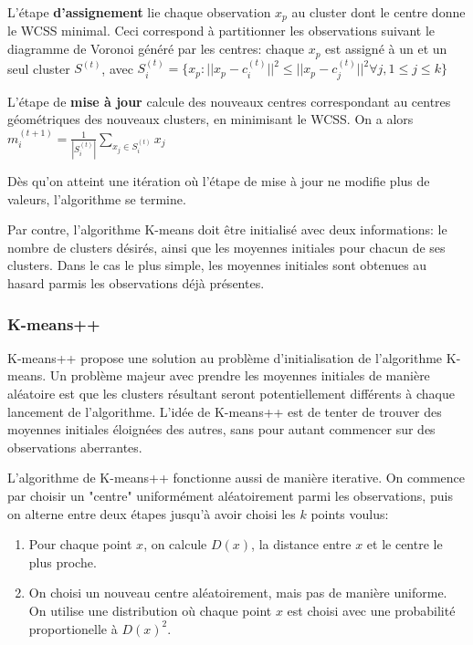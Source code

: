 \documentclass{article}
\begin{document}
      L'étape \textbf{d'assignement} lie chaque observation $x_p$ au cluster dont le centre donne le WCSS minimal. Ceci correspond à partitionner les observations suivant le diagramme de Voronoi généré par les centres: chaque $x_p$ est assigné à un et un seul cluster $S^{(t)}$, avec $S_i^{(t)}=\{x_p:||x_p-c_i^{(t)}||^2\leq ||x_p-c_j^{(t)}||^2\forall j,1\leq j\leq k\}$

      L'étape de \textbf{mise à jour} calcule des nouveaux centres correspondant au centres géométriques des nouveaux clusters, en minimisant le WCSS. On a alors $m_i^{(t+1)}=\frac{1}{|S_i^{(t)}|}\sum_{x_j\in S_i^{(t)}}x_j$

      Dès qu'on atteint une itération où l'étape de mise à jour ne modifie plus de valeurs, l'algorithme se termine.

      Par contre, l'algorithme K-means doit être initialisé avec deux informations: le nombre de clusters désirés, ainsi que les moyennes initiales pour chacun de ses clusters. Dans le cas le plus simple, les moyennes initiales sont obtenues au hasard parmis les observations déjà présentes.

      \newpage
      \subsubsection{K-means++}

        K-means++ propose une solution au problème d'initialisation de l'algorithme K-means. Un problème majeur avec prendre les moyennes initiales de manière aléatoire est que les clusters résultant seront potentiellement différents à chaque lancement de l'algorithme. L'idée de K-means++ est de tenter de trouver des moyennes initiales éloignées des autres, sans pour autant commencer sur des observations aberrantes.

        L'algorithme de K-means++ fonctionne aussi de manière iterative. On commence par choisir un "centre" uniformément aléatoirement parmi les observations, puis on alterne entre deux étapes jusqu'à avoir choisi les $k$ points voulus:

        \begin{enumerate}
          \item Pour chaque point $x$, on calcule $D(x)$, la distance entre $x$ et le centre le plus proche.
          \item On choisi un nouveau centre aléatoirement, mais pas de manière uniforme. On utilise une distribution où chaque point $x$ est choisi avec une probabilité proportionelle à $D(x)^2$.
        \end{enumerate}
\end{document}
